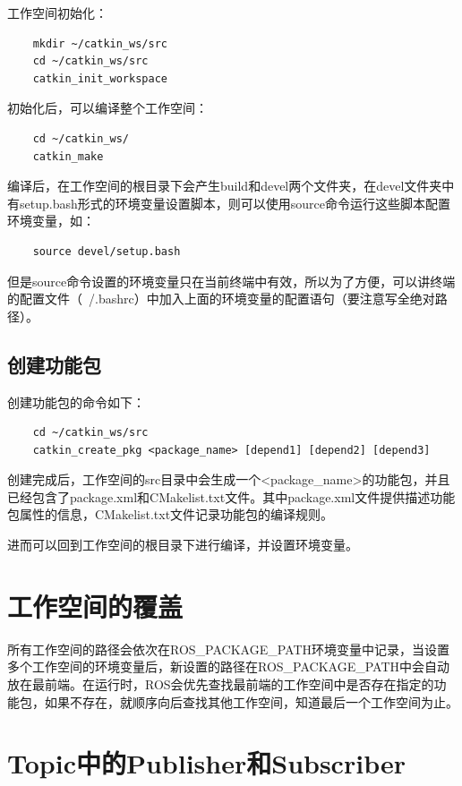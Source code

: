 \documentclass[10pt, oneside]{book}
\begin{document}
工作空间初始化：
\begin{verbatim}
    mkdir ~/catkin_ws/src
    cd ~/catkin_ws/src
    catkin_init_workspace
\end{verbatim}

初始化后，可以编译整个工作空间：
\begin{verbatim}
    cd ~/catkin_ws/
    catkin_make
\end{verbatim}

编译后，在工作空间的根目录下会产生build和devel两个文件夹，在devel文件夹中有setup.bash形式的环境变量设置脚本，则可以使用source命令运行这些脚本配置环境变量，如：
\begin{verbatim}
    source devel/setup.bash
\end{verbatim}

但是source命令设置的环境变量只在当前终端中有效，所以为了方便，可以讲终端的配置文件（~/.bashrc）中加入上面的环境变量的配置语句（要注意写全绝对路径）。

\subsection{创建功能包}

创建功能包的命令如下：

\begin{verbatim}
    cd ~/catkin_ws/src
    catkin_create_pkg <package_name> [depend1] [depend2] [depend3]
\end{verbatim}

创建完成后，工作空间的src目录中会生成一个<package\_name>的功能包，并且已经包含了package.xml和CMakelist.txt文件。其中package.xml文件提供描述功能包属性的信息，CMakelist.txt文件记录功能包的编译规则。

进而可以回到工作空间的根目录下进行编译，并设置环境变量。

\section{工作空间的覆盖}

所有工作空间的路径会依次在ROS\_PACKAGE\_PATH环境变量中记录，当设置多个工作空间的环境变量后，新设置的路径在ROS\_PACKAGE\_PATH中会自动放在最前端。在运行时，ROS会优先查找最前端的工作空间中是否存在指定的功能包，如果不存在，就顺序向后查找其他工作空间，知道最后一个工作空间为止。

\section{Topic中的Publisher和Subscriber}
\end{document}
